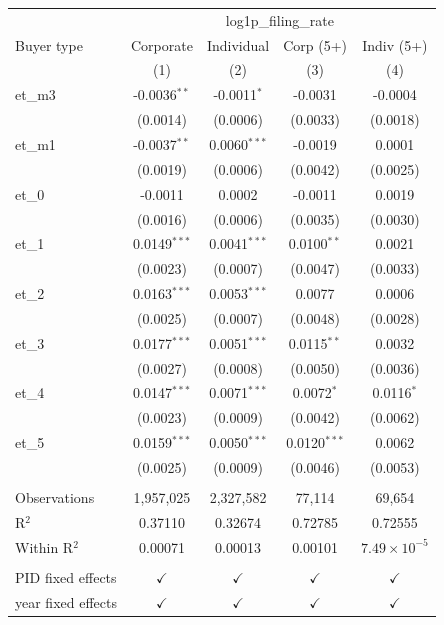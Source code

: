 
\begingroup
\centering
\begin{tabular}{lcccc}
   \toprule
    & \multicolumn{4}{c}{log1p\_filing\_rate}\\
   Buyer type         & Corporate      & Individual     & Corp (5+)      & Indiv (5+) \\   
                      & (1)            & (2)            & (3)            & (4)\\  
   \midrule 
   et\_m3             & -0.0036$^{**}$ & -0.0011$^{*}$  & -0.0031        & -0.0004\\   
                      & (0.0014)       & (0.0006)       & (0.0033)       & (0.0018)\\   
   et\_m1             & -0.0037$^{**}$ & 0.0060$^{***}$ & -0.0019        & 0.0001\\   
                      & (0.0019)       & (0.0006)       & (0.0042)       & (0.0025)\\   
   et\_0              & -0.0011        & 0.0002         & -0.0011        & 0.0019\\   
                      & (0.0016)       & (0.0006)       & (0.0035)       & (0.0030)\\   
   et\_1              & 0.0149$^{***}$ & 0.0041$^{***}$ & 0.0100$^{**}$  & 0.0021\\   
                      & (0.0023)       & (0.0007)       & (0.0047)       & (0.0033)\\   
   et\_2              & 0.0163$^{***}$ & 0.0053$^{***}$ & 0.0077         & 0.0006\\   
                      & (0.0025)       & (0.0007)       & (0.0048)       & (0.0028)\\   
   et\_3              & 0.0177$^{***}$ & 0.0051$^{***}$ & 0.0115$^{**}$  & 0.0032\\   
                      & (0.0027)       & (0.0008)       & (0.0050)       & (0.0036)\\   
   et\_4              & 0.0147$^{***}$ & 0.0071$^{***}$ & 0.0072$^{*}$   & 0.0116$^{*}$\\   
                      & (0.0023)       & (0.0009)       & (0.0042)       & (0.0062)\\   
   et\_5              & 0.0159$^{***}$ & 0.0050$^{***}$ & 0.0120$^{***}$ & 0.0062\\   
                      & (0.0025)       & (0.0009)       & (0.0046)       & (0.0053)\\   
    \\
   Observations       & 1,957,025      & 2,327,582      & 77,114         & 69,654\\  
   R$^2$              & 0.37110        & 0.32674        & 0.72785        & 0.72555\\  
   Within R$^2$       & 0.00071        & 0.00013        & 0.00101        & $7.49\times 10^{-5}$\\   
    \\
   PID fixed effects  & $\checkmark$   & $\checkmark$   & $\checkmark$   & $\checkmark$\\   
   year fixed effects & $\checkmark$   & $\checkmark$   & $\checkmark$   & $\checkmark$\\   
   \bottomrule
\end{tabular}
\par\endgroup


